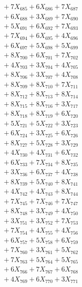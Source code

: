 \documentclass[a4paper,10pt]{article}
\begin{document}
{\begin{align}
&\;  + 7 X_{685} + 6 X_{686} + 7 X_{687} \\[0.3ex]
&\;  + 6 X_{688} + 3 X_{689} + 7 X_{690} \\[0.3ex]
&\;  + 5 X_{691} + 6 X_{692} + 7 X_{693} \\[0.3ex]
&\;  + 7 X_{694} + 6 X_{695} + 4 X_{696} \\[0.3ex]
&\;  + 6 X_{697} + 5 X_{698} + 5 X_{699} \\[0.5ex]\allowbreak
&\;  + 8 X_{700} + 6 X_{701} + 7 X_{702} \\[0.3ex]
&\;  + 4 X_{703} + 3 X_{704} + 4 X_{705} \\[0.3ex]
&\;  + 8 X_{706} + 3 X_{707} + 4 X_{708} \\[0.3ex]
&\;  + 8 X_{709} + 8 X_{710} + 7 X_{711} \\[0.3ex]
&\;  + 8 X_{712} + 8 X_{713} + 8 X_{714} \\[0.3ex]
&\;  + 8 X_{715} + 8 X_{716} + 3 X_{717} \\[0.3ex]
&\;  + 8 X_{718} + 8 X_{719} + 6 X_{720} \\[0.3ex]
&\;  + 5 X_{721} + 5 X_{722} + 3 X_{723} \\[0.3ex]
&\;  + 6 X_{724} + 3 X_{725} + 6 X_{726} \\[0.3ex]
&\;  + 8 X_{727} + 5 X_{728} + 3 X_{729} \\[0.5ex]\allowbreak
&\;  + 4 X_{730} + 4 X_{731} + 6 X_{732} \\[0.3ex]
&\;  + 6 X_{733} + 7 X_{734} + 8 X_{735} \\[0.3ex]
&\;  + 3 X_{736} + 6 X_{737} + 4 X_{738} \\[0.3ex]
&\;  + 8 X_{739} + 5 X_{740} + 8 X_{741} \\[0.3ex]
&\;  + 4 X_{742} + 4 X_{743} + 8 X_{744} \\[0.3ex]
&\;  + 7 X_{745} + 7 X_{746} + 7 X_{747} \\[0.3ex]
&\;  + 8 X_{748} + 3 X_{749} + 4 X_{750} \\[0.3ex]
&\;  + 3 X_{751} + 3 X_{752} + 7 X_{753} \\[0.3ex]
&\;  + 7 X_{754} + 4 X_{755} + 4 X_{756} \\[0.3ex]
&\;  + 6 X_{757} + 5 X_{758} + 6 X_{759} \\[0.5ex]\allowbreak
&\;  + 7 X_{760} + 3 X_{761} + 5 X_{762} \\[0.3ex]
&\;  + 7 X_{763} + 5 X_{764} + 5 X_{765} \\[0.3ex]
&\;  + 6 X_{766} + 7 X_{767} + 6 X_{768} \\[0.3ex]
&\;  + 4 X_{769} + 6 X_{770} + 3 X_{771} \\[0.3ex]

\end{align}}
\end{document}
